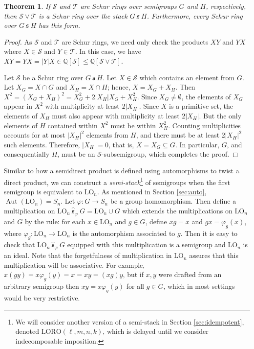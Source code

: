 \documentclass{article}
\theoremstyle{plain}
\newtheorem{Thm}{Theorem}[section]
\theoremstyle{definition}
\renewcommand{\S}{\mathcal{S}}
\newcommand{\T}{\mathcal{T}}
\newcommand{\Q}{\mathbb{Q}}
\newcommand{\QS}{\Q[\S]}
\newcommand{\LO}{\mathrm{LO}}
\newcommand{\LORO}{\mathrm{LORO}}
\newcommand{\s}{\ \mathfrak{s}\ }
\newcommand{\shat}{\ \hat{\mathfrak{s}}_\varphi\ }
\DeclareMathOperator*{\Aut}{Aut}
\begin{document}
\begin{Thm}\label{thm:stackschur} If $\S$ and $\T$ are Schur rings over semigroups $G$ and $H$, respectively, then 
$\S\vee \T$ is a Schur ring over the stack $G \s H$. Furthermore, every Schur ring over $G \s H$ has this form. 
\end{Thm}
\begin{proof}
As $\S$ and $\T$ are Schur rings, we need only check the products $XY$ and $YX$ where $X\in \S$ and $Y\in \T$. In this case, we have $XY = YX = |Y|X\in \QS \le \Q[\S\vee \T]$.

Let $\S$ be a Schur ring over $G \s H$. Let $X\in \S$ which contains an element from $G$. Let $X_G=X\cap G$ and $X_H=X\cap H$; hence, $X = X_G+X_H$. Then $X^2 = (X_G+X_H)^2 = X_G^2 + 2|X_H|X_G + X_H^2$. Since $X_G\neq \emptyset$, the elements of $X_G$ appear in $X^2$ with multiplicity at least $2|X_H|$. Since $X$ is a primitive set, the elements of $X_H$ must also appear with multiplicity at least $2|X_H|$. But the only elements of $H$ contained within $X^2$ must be within $X_H^2$. Counting multiplicities accounts for at most $|X_H|^2$ elements from $H$, and there must be at least $2|X_H|^2$ such elements. Therefore, $|X_H|=0$, that is, $X=X_G\subseteq G$. In particular, $G$, and consequentially $H$, must be an $\S$-subsemigroup, which completes the proof.
\end{proof}

Similar to how a  semidirect product is defined using automorphisms to twist a direct product, we can construct a \emph{semi-stack}\footnote{We will consider another version of a semi-stack in Section \ref{sec:idempotent}, denoted $\LORO(\ell,m,n,k)$, which is delayed until we consider indecomposable imposition.} of semigroups when the first semigroup is equivalent to $\LO_n$. As mentioned in Section \ref{sec:auto}, $\Aut(\LO_n) = S_n$. Let $\varphi: G \to S_n$ be a group homomorphism. Then define a multiplication on \label{semistack}$\LO_n \shat G = \LO_n\cup G$ which extends the multiplications on $\LO_n$ and $G$ by the rule: for each $x\in \LO_n$ and $g\in G$, define $xg = x$ and $gx = \varphi_g(x)$, where $\varphi_g :\LO_n\to \LO_n$ is the automorphism associated to $g$. Then it is easy to check that $\LO_n\shat G$ equipped with this multiplication is a semigroup and $\LO_n$ is an ideal. Note that the forgetfulness of multiplication in $\LO_n$ assures that this multiplication will be associative. For example, $x(gy)= x\varphi_g(y) = x = xy = (xg)y$, but if $x,y$ were drafted from an arbitrary semigroup then $xy = x\varphi_g(y)$ for all $g\in G$, which in most settings would be very restrictive. 
\end{document}
